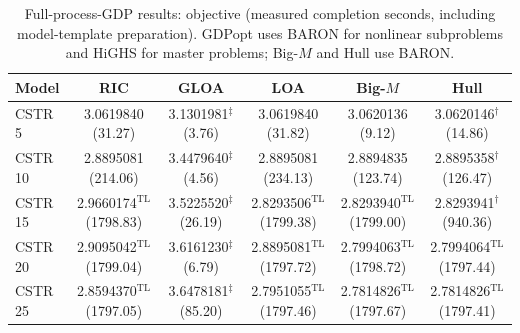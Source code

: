 \documentclass{article}
\begin{document}
\begin{table}[htbp]
\centering
\caption{Full-process-GDP results: objective (measured completion seconds, including model-template preparation). GDPopt uses BARON for nonlinear subproblems and HiGHS for master problems; Big-$M$ and Hull use BARON.}
\label{tab:full-gdp}
\small
\setlength{\tabcolsep}{3pt}
\begin{tabular}{@{}lccccc@{}}
\toprule
Model & RIC & GLOA & LOA & Big-\(M\) & Hull \\
\midrule
CSTR 5 & \makecell{3.0619840\\(31.27)} & \makecell{3.1301981\({}^{\ddagger}\)\\(3.76)} & \makecell{3.0619840\\(31.82)} & \makecell{3.0620136\\(9.12)} & \makecell{3.0620146\({}^{\dagger}\)\\(14.86)} \\
CSTR 10 & \makecell{2.8895081\\(214.06)} & \makecell{3.4479640\({}^{\ddagger}\)\\(4.56)} & \makecell{2.8895081\\(234.13)} & \makecell{2.8894835\\(123.74)} & \makecell{2.8895358\({}^{\dagger}\)\\(126.47)} \\
CSTR 15 & \makecell{2.9660174\({}^{\mathrm{TL}}\)\\(1798.83)} & \makecell{3.5225520\({}^{\ddagger}\)\\(26.19)} & \makecell{2.8293506\({}^{\mathrm{TL}}\)\\(1799.38)} & \makecell{2.8293940\({}^{\mathrm{TL}}\)\\(1799.00)} & \makecell{2.8293941\({}^{\dagger}\)\\(940.36)} \\
CSTR 20 & \makecell{2.9095042\({}^{\mathrm{TL}}\)\\(1799.04)} & \makecell{3.6161230\({}^{\ddagger}\)\\(6.79)} & \makecell{2.8895081\({}^{\mathrm{TL}}\)\\(1797.72)} & \makecell{2.7994063\({}^{\mathrm{TL}}\)\\(1798.72)} & \makecell{2.7994064\({}^{\mathrm{TL}}\)\\(1797.44)} \\
CSTR 25 & \makecell{2.8594370\({}^{\mathrm{TL}}\)\\(1797.05)} & \makecell{3.6478181\({}^{\ddagger}\)\\(85.20)} & \makecell{2.7951055\({}^{\mathrm{TL}}\)\\(1797.46)} & \makecell{2.7814826\({}^{\mathrm{TL}}\)\\(1797.67)} & \makecell{2.7814826\({}^{\mathrm{TL}}\)\\(1797.41)} \\

\end{tabular}
\end{table}
\end{document}
